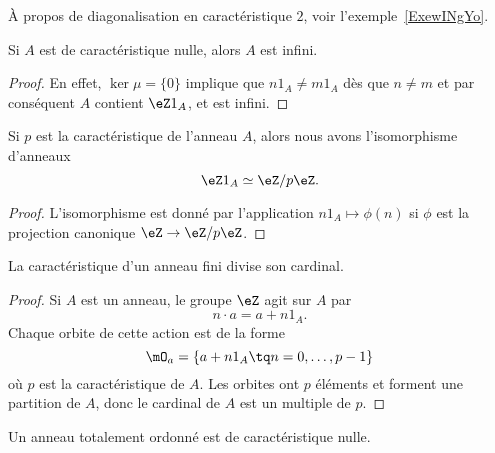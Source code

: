 À propos de diagonalisation en caractéristique \( 2\), voir l'exemple~\ref{ExewINgYo}.

\begin{lemma}
    Si \( A\) est de caractéristique nulle, alors \( A\) est infini.
\end{lemma}

\begin{proof}
    En effet, \( \ker\mu=\{0\} \) implique que \( n1_A \neq  m1_A\) dès que \(n \neq m \) et par conséquent \( A\) contient \(\eZ 1_A \), et  est infini.
\end{proof}

\begin{lemma}       \label{LemHmDaYH}
    Si \( p\) est la caractéristique de l'anneau \( A\), alors nous avons l'isomorphisme d'anneaux
    \begin{equation}
         \eZ 1_A\simeq\eZ/p\eZ.
    \end{equation}
\end{lemma}

\begin{proof}
    L'isomorphisme est donné par l'application \( n1_A\mapsto \phi(n)\) si \( \phi\) est la projection canonique \( \eZ\to \eZ/p\eZ\).
\end{proof}

\begin{proposition}     \label{PropGExaUK}
    La caractéristique d'un anneau fini divise son cardinal.
\end{proposition}

\begin{proof}
    Si \( A\) est un anneau, le groupe \( \eZ\) agit sur \( A\) par
    \begin{equation}
        n\cdot a=a+n1_A.
    \end{equation}
    Chaque orbite de cette action est de la forme
    \begin{equation}
        \mO_a=\{ a+n1_A\tq n=0,\ldots, p-1 \}
    \end{equation}
    où \( p\) est la caractéristique de \( A\). Les orbites ont \( p\) éléments et forment une partition de \( A\), donc le cardinal de \( A\) est un multiple de \( p\).
\end{proof}

\begin{lemma}        \label{LEMooJQIKooQgukqn}
    Un anneau totalement ordonné est de caractéristique nulle.
\end{lemma}

